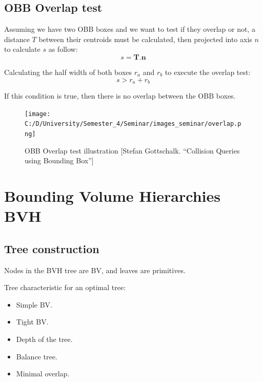 \documentclass[11pt,a4paper]{article}
\begin{document}
	\subsection{OBB Overlap test}
	
	Assuming we have two OBB boxes and we want to test if they overlap or not, a distance $T$ between their centroids must be calculated, then projected into axis $n$ to calculate $s$ as follow:
	\[ s = \textbf{T}.\textbf{n}  \]
	
	Calculating the half width of both boxes $r_a$ and $r_b$ to execute the overlap test: 
	\[ s > r_a + r_b  \]
	
	If this condition is true, then there is no overlap between the OBB boxes.
	
	\begin{figure}[H]
		\begin{center}
			\texttt{[image: C:/D/University/Semester\_4/Seminar/images\_seminar/overlap.png]}
			
			\caption{OBB Overlap test illustration [Stefan Gottschalk. “Collision Queries using Bounding Box”]}
			\label{fig:boat1}
		\end{center}
	\end{figure}
	
	
	\clearpage
	
	\section{Bounding Volume Hierarchies BVH}
	\subsection{Tree construction}
	Nodes in the BVH tree are BV, and leaves are primitives. 
	
	Tree characteristic for an optimal tree:
	\begin{itemize}
		\item Simple BV.
		\item Tight BV.
		\item Depth of the tree.
		\item Balance tree.
		\item Minimal overlap. 
	\end{itemize} 
	
\end{document}
